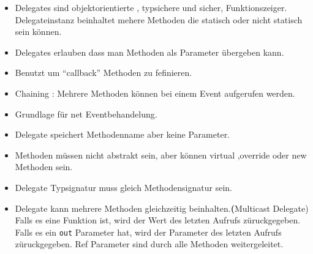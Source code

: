 \documentclass[a4paper,10pt]{scrartcl}
\begin{document}
\begin{itemize}
 \item Delegates sind objektorientierte , typsichere und sicher, Funktionszeiger. 
  \subitem Delegateinstanz beinhaltet mehere Methoden die statisch oder nicht statisch sein können.
  \item Delegates erlauben dass man Methoden als Parameter übergeben kann.
  \item Benutzt um ``callback'' Methoden zu fefinieren.
  \item Chaining : Mehrere Methoden können bei einem Event aufgerufen werden.
  \item Grundlage für net Eventbehandelung.
  \item Delegate speichert Methodenname aber keine Parameter.
  \item Methoden müssen nicht abstrakt sein, aber können virtual ,override oder new Methoden sein.
  \item Delegate Typsignatur muss gleich Methodensignatur sein.
  \item Delegate kann mehrere Methoden gleichzeitig beinhalten.\textbf(Multicast Delegate)
  \subitem Falls es eine Funktion ist, wird der Wert des letzten Aufrufs züruckgegeben.
  \subitem Falls es ein \texttt{out} Parameter hat, wird der Parameter des letzten Aufrufs züruckgegeben.
  \subitem Ref Parameter sind durch alle Methoden weitergeleitet.
  
\end{itemize}
\end{document}
